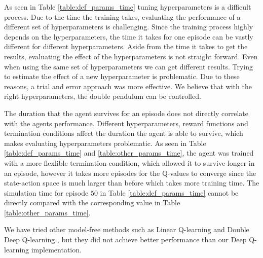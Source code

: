 \documentclass{LTHtwocol} %
\begin{document}
As seen in Table \ref{table:def_params_time} tuning hyperparameters is a difficult process. 
Due to the time the training takes, evaluating the performance of a different set of hyperparameters is challenging.
Since the training process highly depends on the hyperparameters, the time it takes for one episode can be vastly different for different hyperparameters.
Aside from the time it takes to get the results, evaluating the effect of the hyperparameters is not straight forward.
Even when using the same set of hyperparameters we can get different results.
Trying to estimate the effect of a new hyperparameter is problematic.
Due to these reasons, a trial and error approach was more effective.
We believe that with the right hyperparameters, the double pendulum can be controlled.

The duration that the agent survives for an episode does not directly correlate with the agents performance.
Different hyperparameters, reward functions and termination conditions affect the duration the agent is able to survive, which makes evaluating hyperparameters problematic.
As seen in Table \ref{table:def_params_time} and \ref{table:other_params_time}, the agent was trained with a more flexlible termination condition, which allowed it to survive longer in an episode, however it takes more episodes for the Q-values to converge since the state-action space is much larger than before which takes more training time.
The simulation time for episode $50$ in Table \ref{table:def_params_time} cannot be directly compared with the corresponding value in Table \ref{table:other_params_time}.

We have tried other model-free methods such as Linear Q-learning \cite{Linear_Q_Learning} and Double Deep Q-learning \cite{Deep_Double_Q_Learning}, but they did not achieve better performance than our Deep Q-learning \cite{Deep_Q_Learning_First} implementation.
\end{document}
